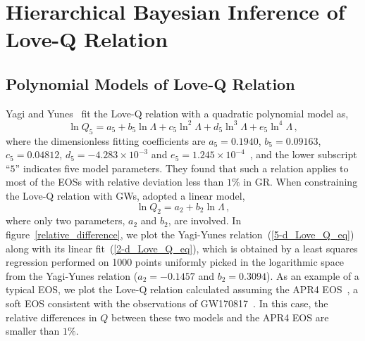 \documentclass[a4paper,11pt]{article}
\begin{document}
\section{Hierarchical Bayesian Inference of Love-Q Relation}
\label{sec:framework}

\subsection{Polynomial Models of Love-Q Relation} 
\label{subsec:framework_parameterization}

Yagi and Yunes~\cite{Yagi:2013bca, Yagi:2013awa, Yagi_2017} fit the Love-Q
relation with a quadratic polynomial model as,
\begin{equation}
\label{5-d_Love_Q_eq}
    \ln Q_{5}=a_5 + b_5 \ln \Lambda + c_5 \ln^2\Lambda + d_5 \ln^3\Lambda + e_5
    \ln^4 \Lambda\,,
\end{equation}
where the dimensionless fitting coefficients are $a_5=0.1940$, $b_5=0.09163$,
$c_5=0.04812$, $d_5=-4.283\times 10^{-3}$ and $e_5=1.245\times
10^{-4}$~\cite{Yagi_2017}, and the lower subscript ``$5$'' indicates five model
parameters.  They found that such a relation applies to most of the EOSs with 
relative deviation less than $1\%$ in GR. When constraining the Love-Q relation
with GWs, \citet{Samajdar:2020xrd} adopted a linear model,
\begin{equation}
\label{2-d_Love_Q_eq}
    \ln Q_{2} = a_2 + b_2 \ln \Lambda\,,
\end{equation}
where only two parameters, $a_2$ and $b_2$, are involved.  In
figure~\ref{relative_difference}, we plot the Yagi-Yunes
relation~(\ref{5-d_Love_Q_eq}) along with its linear fit~(\ref{2-d_Love_Q_eq}),
which is obtained by a least squares regression performed on 1000 points
uniformly picked in the logarithmic space from the Yagi-Yunes relation ($a_2=-0.1457$
and $b_2=0.3094$).  As an example of a typical EOS, we plot the
Love-Q relation calculated assuming the APR4 EOS~\cite{PhysRevC.58.1804}, a soft
EOS consistent with the observations of GW170817~\cite{LIGOScientific:2017vwq,
LIGOScientific:2018cki, LIGOScientific:2018hze}. In this case, the relative
differences in $Q$ between these two models and the APR4 EOS are smaller
than $1\%$. 
\end{document}
